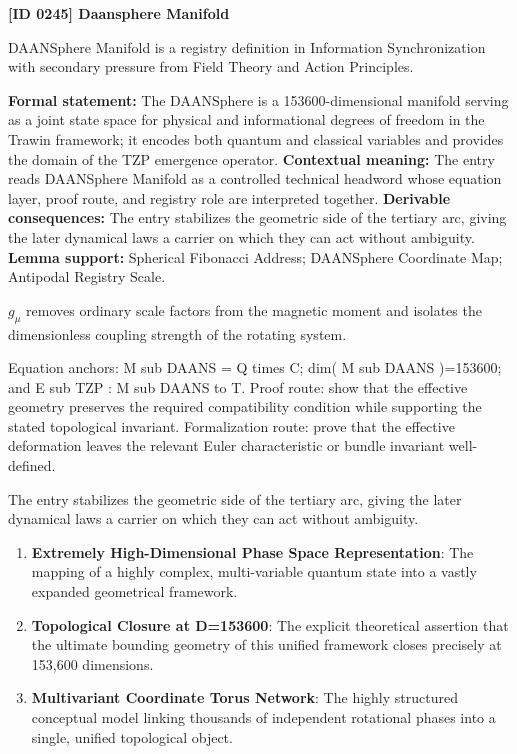 \clearpage
\noindent\textbf{[ID 0245] Daansphere Manifold}\par
\vspace{0.35em}
\begingroup\small
{}
DAANSphere Manifold is a registry definition in Information Synchronization with secondary pressure from Field Theory and Action Principles.

\begingroup\footnotesize\setlength{\emergencystretch}{3em}\sloppy
\textbf{Formal statement:} The DAANSphere is a 153600-dimensional manifold serving as a joint state space for physical and informational degrees of freedom in the Trawin framework; it encodes both quantum and classical variables and provides the domain of the TZP emergence operator. \textbf{Contextual meaning:} The entry reads DAANSphere Manifold as a controlled technical headword whose equation layer, proof route, and registry role are interpreted together. \textbf{Derivable consequences:} The entry stabilizes the geometric side of the tertiary arc, giving the later dynamical laws a carrier on which they can act without ambiguity. \textbf{Lemma support:} Spherical Fibonacci Address; DAANSphere Coordinate Map; Antipodal Registry Scale.\par
\endgroup

\(g_\mu\) removes ordinary scale factors from the magnetic moment and isolates the dimensionless coupling strength of the rotating system.

Equation anchors: M sub DAANS = Q times C; dim( M sub DAANS )=153600; and E sub TZP : M sub DAANS to T. Proof route: show that the effective geometry preserves the required compatibility condition while supporting the stated topological invariant. Formalization route: prove that the effective deformation leaves the relevant Euler characteristic or bundle invariant well-defined.

The entry stabilizes the geometric side of the tertiary arc, giving the later dynamical laws a carrier on which they can act without ambiguity.
\endgroup

\begin{enumerate}[leftmargin=1.6em,itemsep=6pt,topsep=4pt]
\item \textbf{Extremely High-Dimensional Phase Space Representation}: The mapping of a highly complex, multi-variable quantum state into a vastly expanded geometrical framework.
\item \textbf{Topological Closure at D=153600}: The explicit theoretical assertion that the ultimate bounding geometry of this unified framework closes precisely at 153,600 dimensions.
\item \textbf{Multivariant Coordinate Torus Network}: The highly structured conceptual model linking thousands of independent rotational phases into a single, unified topological object.
\end{enumerate}

